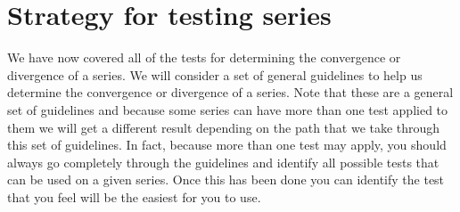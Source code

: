 \section{Strategy for testing series}

We have now covered all of the tests for determining the convergence or divergence of a series. We will consider a set of general guidelines to help us determine the convergence or divergence of a series. Note that these are a general set of guidelines and because some series can have more than one test applied to them we will get a different result depending on the path that we take through this set of guidelines. In fact, because more than one test may apply, you should always go completely through the guidelines and identify all possible tests that can be used on a given series. Once this has been done you can identify the test that you feel will be the easiest for you to use.


